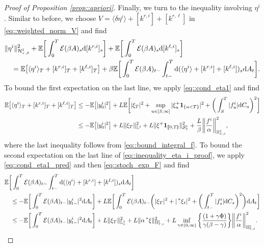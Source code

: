 \documentclass[10pt]{article} %
\newcommand\cE{\mathcal E}
\newcommand\cH{\mathcal H}
\newcommand\cS{\mathcal S}
\newcommand{\smalltext}[1]{\text{\fontsize{4}{4}\selectfont$#1$}}
\def \E{\mathbb{E}}
\def \H{\mathbb{H}}
\def \L{\mathbb{L}}
\newcommand{\brs}[1]{\prescript{\ast}{}{#1}}
\newcommand{\1}{\mathbf{1}}
\def\d{\mathrm{d}}
\begin{document}
\begin{proof}[Proof of Proposition \ref{prop::apriori}]
\medskip
Finally, we turn to the inequality involving $\eta^i$. Similar to before, we choose $V = \langle\delta\eta^i\rangle + [k^{r,i}] + [k^{r,\ell}]$ in \eqref{eq::weighted_norm_V} and find
\begin{align}\label{eq::inequality_eta_i_proof}
	&\|\eta^i\|^2_{\cH^\smalltext{2}_{\smalltext{T}\smalltext{,}\beta}} + \E\bigg[\int_0^T \cE(\beta A)_s \d [k^{r,i}]_s\bigg] + \E\bigg[\int_0^T \cE(\beta A)_s \d [k^{\ell,i}]_s\bigg] \nonumber\\
	&\quad= \E\big[ \langle \eta^i \rangle_T + [k^{r,i}]_T + [k^{\ell,i}]_T \big] + \beta \E \bigg[ \int_0^T \cE(\beta A)_{t-} \int_{t-}^T \d (\langle\eta^i \rangle + [k^{r,i}] + [k^{\ell,i}])_s \d A_t \bigg].
\end{align}
To bound the first expectation on the last line, we apply \eqref{eq::cond_eta1} and find
\begin{align*}
	\E\big[ \langle \eta^i \rangle_T + [k^{r,i}]_T + [k^{\ell,i}]_T \big] 
	&\leq -\E\big[|y^i_0|^2\big] + L \E\bigg[ |\xi_T|^2 + \sup_{u \in [S,\infty]} |\xi^+_u \mathbf{1}_{\{u < T\}}|^2 + \bigg(\int_S^T |f^i_u| \d C_u\bigg)^2 \bigg] \\
	&\leq -\E\big[|y^i_0|^2\big] + L \|\xi_T\|^2_{\L^\smalltext{2}} + L\|\xi^+\1_{\llbracket 0,T\rrparenthesis}\|^2_{\cS^\smalltext{2}_\smalltext{T}} + \frac{L}{\beta} \bigg\|\frac{f^i}{\alpha}\bigg\|^2_{\H^\smalltext{2}_{\smalltext{T}\smalltext{,}\smalltext{\beta}}},
\end{align*}
where the last inequality follows from \eqref{eq::bound_integral_f}. To bound the second expectation on the last line of \eqref{eq::inequality_eta_i_proof}, we apply \eqref{eq::cond_eta1_pred} and then \eqref{eq::stoch_exp_F} and find
\begin{align*}
	&\E\bigg[ \int_0^T \cE(\beta A)_{t-} \int_{t-}^T \d (\langle\eta^i \rangle + [k^{r,i}] + [k^{\ell,i}])_s \d A_t \bigg] \\
	&\quad \leq - \E\bigg[\int_0^T \cE(\beta A)_{t-} |y^i_{t-}|^2\d A_t\bigg] + L\E\bigg[ \int_0^T \cE(\beta A)_{t-} \bigg(|\xi_T|^2 + |\brs{\xi}_t|^2 +  \bigg(\int_{t-}^T |f^i_s|\d C_s\bigg)^2\bigg) \d A_t \bigg] \\
	&\quad\leq - \E\bigg[\int_0^T \cE(\beta A)_{t-} |y^i_{t-}|^2\d A_t\bigg] +  L\|\xi_T\|^2_{\L^\smalltext{2}_\smalltext{\beta}} + L\| \alpha\brs{\xi}\|^2_{\H^\smalltext{2}_{\smalltext{T}\smalltext{,}\smalltext{\beta}}} + L\inf_{\gamma \in (0,\infty)} \bigg\{\frac{(1+\gamma\Phi)}{\gamma(\beta-\gamma)}\bigg\} \bigg\|\frac{f^i}{\alpha}\bigg\|^2_{\H^\smalltext{2}_{\smalltext{T}\smalltext{,}\smalltext{\beta}}}.

\end{align*}
\end{proof}
\end{document}

